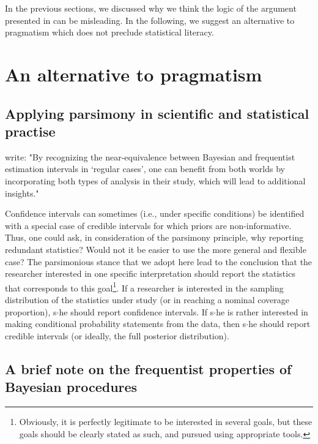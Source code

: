\documentclass[a4paper,man,natbib,floatsintext,donotrepeattitle]{apa6}
\begin{document}

In the previous sections, we discussed why we think the logic of the argument presented in \cite{albers_credible_2018} can be misleading. In the following, we suggest an alternative to pragmatism which does not preclude statistical literacy.

\section{An alternative to pragmatism}

\subsection{Applying parsimony in scientific and statistical practise}

\cite{albers_credible_2018} write: "By recognizing the near-equivalence between Bayesian and frequentist estimation intervals in ‘regular cases’, one can benefit from both worlds by incorporating both types of analysis in their study, which will lead to additional insights."

Confidence intervals can sometimes (i.e., under specific conditions) be identified with a special case of credible intervals for which priors are non-informative. Thus, one could ask, in consideration of the parsimony principle, why reporting redundant statistics? Would not it be easier to use the more general and flexible case? The parsimonious stance that we adopt here lead to the conclusion that the researcher interested in one specific interpretation should report the statistics that corresponds to this goal\footnote{Obviously, it is perfectly legitimate to be interested in several goals, but these goals should be clearly stated as such, and pursued using appropriate tools.}. If a researcher is interested in the sampling distribution of the statistics under study (or in reaching a nominal coverage proportion), s$\cdot$he should report confidence intervals. If s$\cdot$he is rather interested in making conditional probability statements from the data, then s$\cdot$he should report credible intervals (or ideally, the full posterior distribution).

\subsection{A brief note on the frequentist properties of Bayesian procedures}
\end{document}
